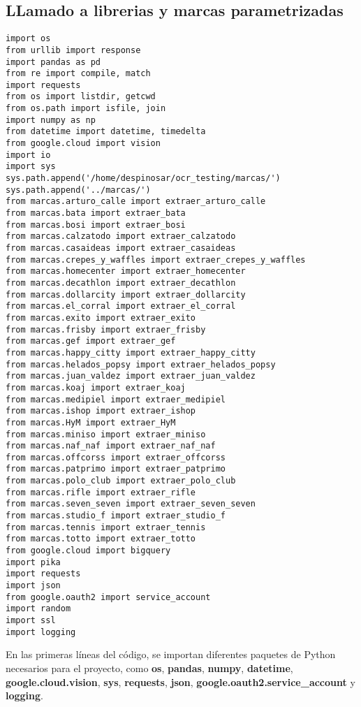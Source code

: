\documentclass{article}
\begin{document}
\subsection{LLamado a librerias y marcas parametrizadas}
\begin{lstlisting}
import os
from urllib import response
import pandas as pd
from re import compile, match
import requests
from os import listdir, getcwd
from os.path import isfile, join
import numpy as np
from datetime import datetime, timedelta
from google.cloud import vision
import io
import sys
sys.path.append('/home/despinosar/ocr_testing/marcas/')
sys.path.append('../marcas/')
from marcas.arturo_calle import extraer_arturo_calle
from marcas.bata import extraer_bata
from marcas.bosi import extraer_bosi
from marcas.calzatodo import extraer_calzatodo
from marcas.casaideas import extraer_casaideas
from marcas.crepes_y_waffles import extraer_crepes_y_waffles
from marcas.homecenter import extraer_homecenter
from marcas.decathlon import extraer_decathlon
from marcas.dollarcity import extraer_dollarcity
from marcas.el_corral import extraer_el_corral
from marcas.exito import extraer_exito
from marcas.frisby import extraer_frisby
from marcas.gef import extraer_gef
from marcas.happy_citty import extraer_happy_citty
from marcas.helados_popsy import extraer_helados_popsy
from marcas.juan_valdez import extraer_juan_valdez
from marcas.koaj import extraer_koaj
from marcas.medipiel import extraer_medipiel
from marcas.ishop import extraer_ishop
from marcas.HyM import extraer_HyM
from marcas.miniso import extraer_miniso
from marcas.naf_naf import extraer_naf_naf
from marcas.offcorss import extraer_offcorss
from marcas.patprimo import extraer_patprimo
from marcas.polo_club import extraer_polo_club
from marcas.rifle import extraer_rifle
from marcas.seven_seven import extraer_seven_seven
from marcas.studio_f import extraer_studio_f
from marcas.tennis import extraer_tennis
from marcas.totto import extraer_totto
from google.cloud import bigquery
import pika
import requests
import json
from google.oauth2 import service_account
import random
import ssl
import logging
\end{lstlisting}
En las primeras líneas del código, se importan diferentes paquetes de Python necesarios para el proyecto, como \textbf{os}, \textbf{pandas}, \textbf{numpy}, \textbf{datetime}, \textbf{google.cloud.vision}, \textbf{sys}, \textbf{requests}, \textbf{json}, \textbf{google.oauth2.service\_account} y \textbf{logging}.
\end{document}
